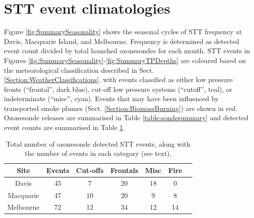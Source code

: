 \documentclass[acp, manuscript]{copernicus} %
\begin{document}
\section{STT event climatologies}
  \label{sec:eventclimatologies}
  Figure \ref{fig:SummarySeasonality} shows the seasonal cycles of STT frequency at Davis, Macquarie Island, and Melbourne.
  Frequency is determined as detected event count divided by total launched ozonesondes for each month.
  STT events in Figures \ref{fig:SummarySeasonality}-\ref{fig:SummaryTPDepths} are coloured based on the meteorological classification described in Sect. \ref{Section:WeatherClassifications}, with events classified as either low pressure fronts (“frontal”, dark blue), cut-off low pressure systems (“cutoff”, teal), or indeterminate (“misc”, cyan).
  Events that may have been influenced by transported smoke plumes (Sect. \ref{Section:BiomassBurning}) are shown in red.
  Ozonesonde releases are summarised in Table \ref{table:sondesummary} and detected event counts are summarised in Table \ref{table:EventCounts}.
  \begin{table}[t]
    \caption{Total number of ozonesonde detected STT events, along with the number of events in each category (see text).}
    \begin{tabular}{ c   c   c   c   c   c   c } 
      \hline
      Site & Events & Cut-offs & Frontals & Misc & Fire \\
      \hline
      Davis     & 45 & 7  & 20 & 18 & 0 \\ 
      Macquarie & 47 & 10 & 20 & 9  & 8 \\
      Melbourne & 72 & 12 & 34 & 12 & 14 \\
      \hline
    \end{tabular}
    \label{table:EventCounts}
  \end{table}
\end{document}
